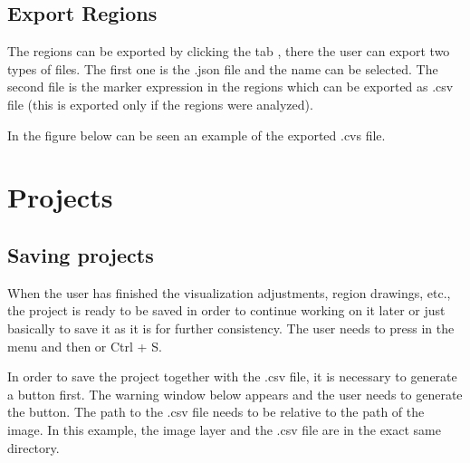 \documentclass[letterpaper,10pt,english,openany,oneside]{sphinxmanual}
\begin{document}
\subsection{Export Regions}
\label{\detokenize{docs/starting/regions:export-regions}}
\sphinxAtStartPar
The regions can be exported by clicking the tab , there the user can export two types of files. The first one is the .json file and the name can be selected. The second file is the marker expression in the regions which can be exported as .csv file (this is exported only if the regions were analyzed).

\sphinxAtStartPar
{}

\sphinxAtStartPar
In the figure below can be seen an example of the exported .cvs file.

\sphinxAtStartPar
{}

\sphinxstepscope


\section{Projects}
\label{\detokenize{docs/starting/projects:projects}}\label{\detokenize{docs/starting/projects::doc}}

\subsection{Saving projects}
\label{\detokenize{docs/starting/projects:saving-projects}}
\sphinxAtStartPar
When the user has finished the visualization adjustments, region drawings, etc., the project is ready to be saved in order to continue working on it later or just basically to save it as it is for further consistency. The user needs to press  in the menu and then  or Ctrl + S.

\sphinxAtStartPar
{}

\sphinxAtStartPar
In order to save the project together with the .csv file, it is necessary to generate a button first. The warning window below appears and the user needs to generate the button. The path to the .csv file needs to be relative to the path of the image. In this example, the image layer and the .csv file are in the exact same directory.

\sphinxAtStartPar
{}
\end{document}
